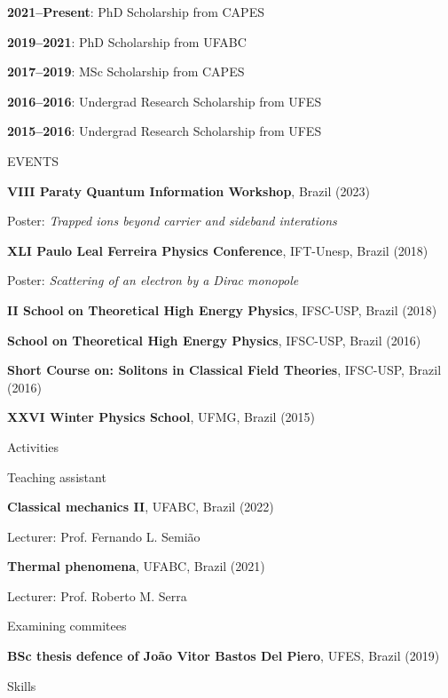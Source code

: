\documentclass[11pt]{article}
\newcommand{\linesep}{\vspace*{1em}}
\newcommand{\MySection}[1]{
    \vspace*{2em}
    {\fontfamily{cmbr} \large \color{Indigo} \uppercase{#1} \hrulefill} \par
    \vspace*{1em}
}
\newcommand{\MySubSec}[1]{
    \vspace*{0.25em}
    {\fontfamily{cmbr} \color{Indigo} \selectfont #1} \par
    \vspace*{0.25em}
}
\newcommand{\GrantItem}[2]{
    \textbf{#1}: #2 \par
}
\newcommand{\EventItem}[4]{
    \textbf{#1}, #2 (#3) \par
    {\small #4} \par
}
\newcommand{\ActivItem}[3]{
    {\small
    \quad \textbf{#1}, #2 \par
    \quad #3} \par
}
\begin{document}
\GrantItem{2021--Present}{PhD Scholarship from CAPES}

\GrantItem{2019--2021}{PhD Scholarship from UFABC}

\GrantItem{2017--2019}{MSc Scholarship from CAPES}

\GrantItem{2016--2016}{Undergrad Research Scholarship from UFES}

\GrantItem{2015--2016}{Undergrad Research Scholarship from UFES}

\MySection{Events}

\EventItem{VIII Paraty Quantum Information Workshop}
{Brazil}
{2023}
{\quad Poster: \emph{Trapped ions beyond carrier and sideband interations}}

\linesep

\EventItem{XLI Paulo Leal Ferreira Physics Conference}
{IFT-Unesp, Brazil}
{2018}
{\quad Poster: \emph{Scattering of an electron by a Dirac monopole}}

\linesep

\EventItem{II School on Theoretical High Energy Physics}
{IFSC-USP, Brazil}
{2018}

\linesep

\EventItem{School on Theoretical High Energy Physics}
{IFSC-USP, Brazil}
{2016}

\linesep

\EventItem{Short Course on: Solitons in Classical Field Theories}
{IFSC-USP, Brazil}
{2016}

\linesep

\EventItem{XXVI Winter Physics School}
{UFMG, Brazil}
{2015}

\MySection{Activities}

\MySubSec{Teaching assistant}

\ActivItem{Classical mechanics II}
{UFABC, Brazil (2022)}
{Lecturer: Prof. Fernando L. Semião}

\ActivItem{Thermal phenomena}
{UFABC, Brazil (2021)}
{Lecturer: Prof. Roberto M. Serra}

\linesep

\MySubSec{Examining commitees}

\ActivItem{BSc thesis defence of João Vitor Bastos Del Piero}
{UFES, Brazil (2019)}

\MySection{Skills}
\end{document}
